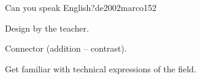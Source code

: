 \begin{syllabus}
\begin{unit}{Can you speak English?}{}{de2002marco}{15}{2}
\begin{topics}
      \item Design by the teacher.
      \item Connector (addition – contrast).
   \end{topics}

   \begin{learningoutcomes}
      \item Get familiar with technical expressions of the field.
   \end{learningoutcomes}

\end{unit}

\begin{coursebibliography}
\end{coursebibliography}

\end{syllabus}
%
